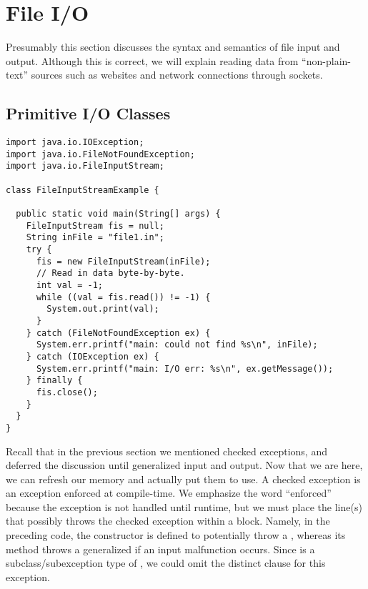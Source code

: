 \section{File I/O}

Presumably this section discusses the syntax and semantics of file input and output. 
Although this is correct, we will explain reading data from ``non-plain-text'' sources such as websites and network connections through sockets. 

\subsection{Primitive I/O Classes}


\begin{lstlisting}[language=MyJava]
import java.io.IOException;
import java.io.FileNotFoundException;
import java.io.FileInputStream;

class FileInputStreamExample {

  public static void main(String[] args) {
    FileInputStream fis = null;
    String inFile = "file1.in";
    try {
      fis = new FileInputStream(inFile);
      // Read in data byte-by-byte.
      int val = -1;
      while ((val = fis.read()) != -1) { 
        System.out.print(val); 
      }
    } catch (FileNotFoundException ex) {
      System.err.printf("main: could not find %s\n", inFile);
    } catch (IOException ex) {
      System.err.printf("main: I/O err: %s\n", ex.getMessage());
    } finally {
      fis.close();
    } 
  } 
}
\end{lstlisting}

Recall that in the previous section we mentioned checked exceptions, and deferred the discussion until generalized input and output. 
Now that we are here, we can refresh our memory and actually put them to use. 
A checked exception is an exception enforced at compile-time. 
We emphasize the word ``enforced'' because the exception is not handled until runtime, but we must place the line(s) that possibly throws the checked exception within a  block. 
Namely, in the preceding code, the  constructor is defined to potentially throw a , whereas its  method throws a generalized  if an input malfunction occurs. 
Since  is a subclass/subexception type of , we could omit the distinct  clause for this exception. 

